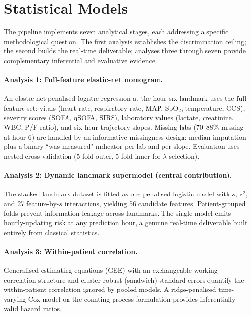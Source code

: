 \section{Statistical Models}
\label{sec:models}

The pipeline implements seven analytical stages, each addressing a specific
methodological question. The first analysis establishes the discrimination
ceiling; the second builds the real-time deliverable; analyses three through
seven provide complementary inferential and evaluative evidence.

\paragraph{Analysis 1: Full-feature elastic-net nomogram.}
An elastic-net penalised logistic regression at the hour-six landmark uses the
full feature set: vitals (heart rate, respiratory rate, MAP, SpO$_2$,
temperature, GCS), severity scores (SOFA, qSOFA, SIRS), laboratory values
(lactate, creatinine, WBC, P/F ratio), and six-hour trajectory slopes. Missing
labs (70--88\% missing at hour 6) are handled by an informative-missingness
design: median imputation plus a binary ``was measured'' indicator per lab and
per slope. Evaluation uses nested cross-validation (5-fold outer, 5-fold inner
for $\lambda$ selection).

\paragraph{Analysis 2: Dynamic landmark supermodel (central contribution).}
The stacked landmark dataset is fitted as one penalised logistic model with
$s$, $s^2$, and 27 feature-by-$s$ interactions, yielding 56 candidate features.
Patient-grouped folds prevent information leakage across landmarks. The
single model emits hourly-updating risk at any prediction hour, a genuine
real-time deliverable built entirely from classical statistics.

\paragraph{Analysis 3: Within-patient correlation.}
Generalised estimating equations (GEE) with an exchangeable working correlation
structure and cluster-robust (sandwich) standard errors quantify the
within-patient correlation ignored by pooled models. A ridge-penalised
time-varying Cox model on the counting-process formulation provides
inferentially valid hazard ratios.

